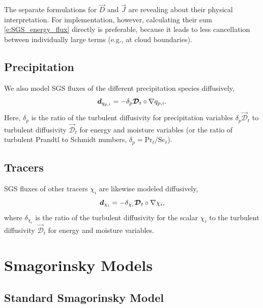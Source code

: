 \documentclass{report}
\begin{document}
The separate formulations for $\vec{D}$ and $\vec{J}$ are revealing about their physical interpretation. For implementation, however, calculating their sum \eqref{e:SGS_energy_flux} directly is preferable, because it leads to less cancellation between individually large terms (e.g., at cloud boundaries).

\subsection{Precipitation}

We also model SGS fluxes of the different precipitation species diffusively,
\begin{equation}\label{eq:sgs-precip-flux}
\boldsymbol{{d}}_{q_{p, i}} = - \delta_p \boldsymbol{{\mathcal{D}}}_t \circ \nabla q_{p, i}.
\end{equation}
Here, $\delta_p$ is the ratio of the turbulent diffusivity for precipitation variables $\delta_p \vec{\mathcal{D}}_t$ to turbulent diffusivity $\vec{\mathcal{D}}_t$ for energy and moisture variables (or the ratio of turbulent Prandtl to Schmidt numbers, $\delta_p = \mathrm{Pr}_t/\mathrm{Sc}_t$). 

\subsection{Tracers}

SGS fluxes of other tracers $\chi_i$ are likewise modeled diffusively,
\begin{equation}\label{eq:sgs-tracer-flux}
\boldsymbol{{d}}_{\chi_i} = - \delta_{\chi_i} \boldsymbol{{\mathcal{D}}}_t \circ \nabla \chi_i,
\end{equation}
where $\delta_{\chi_i}$ is the ratio of the turbulent diffusivity for the scalar $\chi_i$ to the turbulent diffusivity $\vec{\mathcal{D}}_t$ for energy and moisture variables.

\section{Smagorinsky Models}

\subsection{Standard Smagorinsky Model}
\end{document}
